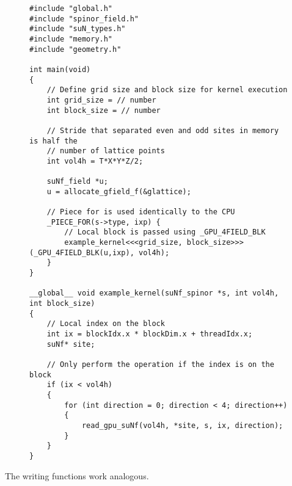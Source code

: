 \documentclass[12pt]{article}
\begin{document}
\begin{figure}[H]
\begin{lstlisting}[caption=Example for reading the field values of a spinor]
#include "global.h"
#include "spinor_field.h"
#include "suN_types.h"
#include "memory.h"
#include "geometry.h"

int main(void) 
{
    // Define grid size and block size for kernel execution
    int grid_size = // number
    int block_size = // number
    
    // Stride that separated even and odd sites in memory is half the 
    // number of lattice points
    int vol4h = T*X*Y*Z/2;
    
    suNf_field *u;
    u = allocate_gfield_f(&glattice);
    
    // Piece for is used identically to the CPU
    _PIECE_FOR(s->type, ixp) {
        // Local block is passed using _GPU_4FIELD_BLK
        example_kernel<<<grid_size, block_size>>>(_GPU_4FIELD_BLK(u,ixp), vol4h);
    }
}

__global__ void example_kernel(suNf_spinor *s, int vol4h, int block_size) 
{
    // Local index on the block
    int ix = blockIdx.x * blockDim.x + threadIdx.x;
    suNf* site;

    // Only perform the operation if the index is on the block
    if (ix < vol4h) 
    {
        for (int direction = 0; direction < 4; direction++) 
        {
            read_gpu_suNf(vol4h, *site, s, ix, direction);
        }
    }
}
\end{lstlisting}
\end{figure}

The writing functions work analogous.
\end{document}
